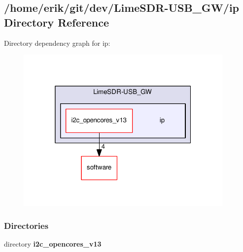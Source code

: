 \subsection{/home/erik/git/dev/\+Lime\+S\+D\+R-\/\+U\+S\+B\+\_\+\+G\+W/ip Directory Reference}
\label{dir_d32fa0e299a2f86acbd1b8aa54411c96}
Directory dependency graph for ip\+:
\nopagebreak
\begin{figure}[H]
\begin{center}
\leavevmode
\includegraphics[width=302pt]{dir_d32fa0e299a2f86acbd1b8aa54411c96_dep}
\end{center}
\end{figure}
\subsubsection*{Directories}
\begin{DoxyCompactItemize}
\item 
directory {\bf i2c\+\_\+opencores\+\_\+v13}
\end{DoxyCompactItemize}
